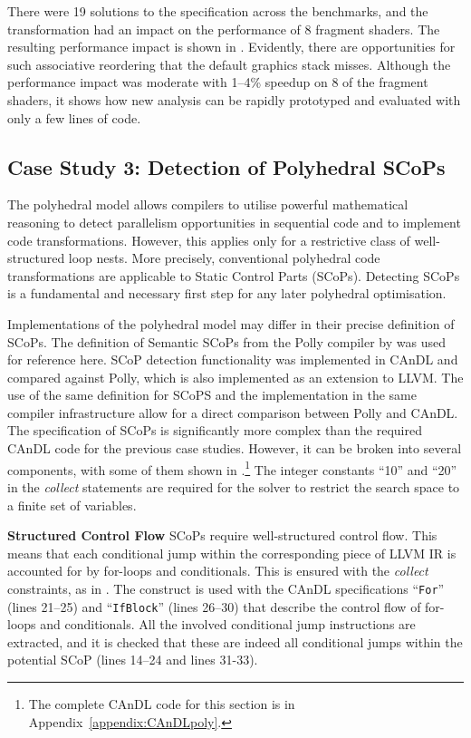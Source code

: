     There were 19 solutions to the specification across the benchmarks, and
    the transformation had an impact on the performance of 8 fragment shaders.
    The resulting performance impact is shown in .
    Evidently, there are opportunities for such associative reordering that
    the default graphics stack misses.
    Although the performance impact was moderate with 1--4\% speedup on 8
    of the fragment shaders, it shows how new analysis can be rapidly prototyped
    and evaluated with only a few lines of code.

\subsection{Case Study 3: Detection of Polyhedral SCoPs}

    The polyhedral model
    \citep{Karp:1967:OCU:321406.321418,benabderrahmane2010polyhedral} allows
    compilers to utilise powerful mathematical reasoning to detect parallelism
    opportunities in sequential code and to implement code transformations.
    However, this applies only for a restrictive class of well-structured loop
    nests.
    More precisely, conventional polyhedral code transformations are applicable
    to Static Control Parts (SCoPs).
    Detecting SCoPs is a fundamental and necessary first step for any later
    polyhedral optimisation.

    Implementations of the polyhedral model may differ in their precise
    definition of SCoPs.
    The definition of Semantic SCoPs from the Polly compiler by
    \citet{Lengauer2012Polly} was used for reference here.
    SCoP detection functionality was implemented in CAnDL and compared against
    Polly, which is also implemented as an extension to LLVM.
    The use of the same definition for SCoPS and the implementation in the same
    compiler infrastructure allow for a direct comparison between Polly and
    CAnDL.
    The specification of SCoPs is significantly more complex than the required
    CAnDL code for the previous case studies.
    However, it can be broken into several components, with some of them shown
    in .\footnote{The complete CAnDL code for this section
    is in Appendix~\ref{appendix:CAnDLpoly}.}
    The integer constants ``10'' and ``20'' in the \textit{collect}
    statements are required for the solver to restrict the search space to a
    finite set of variables.

    \vspace{2mm}
    \noindent
    \textbf{Structured Control Flow}
    SCoPs require well-structured control flow.
    This means that each conditional jump within the
    corresponding piece of LLVM IR is accounted for by for-loops and
    conditionals.
    This is ensured with the {\it collect} constraints, as in
    .
    The construct is used with the CAnDL specifications ``{\tt For}''
    (lines 21--25) and ``{\tt IfBlock}'' (lines 26--30) that describe the
    control flow of for-loops and conditionals.
    All the involved conditional jump instructions are extracted, and it is
    checked that these are indeed all conditional jumps within the potential
    SCoP (lines 14--24 and lines 31-33).

